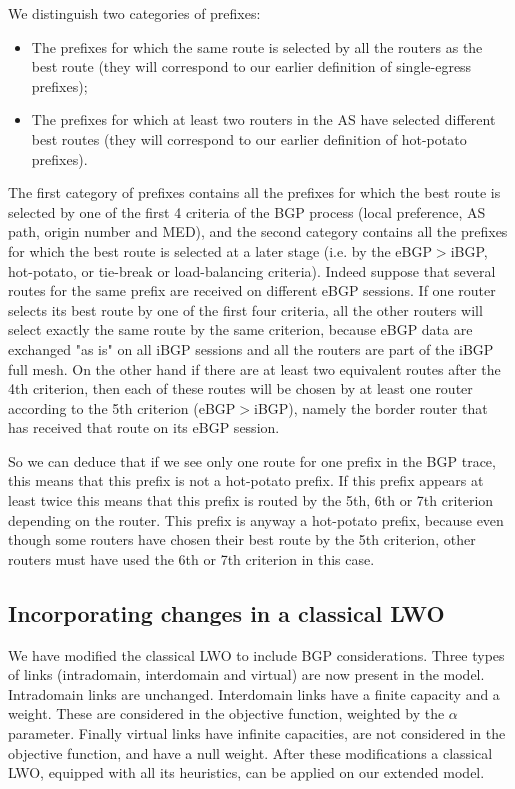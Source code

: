 \documentclass{acm_proc_article-sp}
\begin{document}
We distinguish two categories of prefixes:
\begin{itemize}
\item The prefixes for which the same route is selected by all the
  routers as the best route (they will correspond to our earlier definition of single-egress prefixes);
\item The prefixes for which at least two routers in the AS have
selected different best routes (they will correspond to our earlier definition of hot-potato prefixes).
\end{itemize}

The first category of prefixes contains all the prefixes
for which the best route is selected by one of the first 4 criteria
of the BGP process (local preference, AS path, origin
number and MED), 
and the second category contains all the prefixes for
which the best route is selected at a later stage (i.e. by the eBGP$>$iBGP, hot-potato, or tie-break
or load-balancing criteria). Indeed suppose that several routes for the same
prefix are received on different eBGP sessions. If one router selects its best
route by one of the first four criteria, all the other routers will select exactly the
same route by the same criterion, because eBGP data are exchanged "as is" 
on all iBGP sessions and all the routers are part of the iBGP
full mesh. On the other hand if there are at least two equivalent routes 
after the 4th criterion, then each of these routes will be chosen by at least one router 
according to the 5th criterion (eBGP$>$iBGP), namely the border router that has
received that route on its eBGP session.

So we can deduce that if we see only one route for one prefix in the BGP trace,
this means that this prefix is not a hot-potato prefix. 
If this prefix appears at least twice this
means that this prefix is routed by the 5th, 6th or 7th criterion
depending on the router. This prefix is anyway a hot-potato prefix, because
even though some routers have chosen their best route by the 5th criterion,
other routers must have used the 6th or 7th criterion in this case.

\subsection{Incorporating changes in a classical LWO}

We have modified the classical LWO to 
include BGP considerations. Three types of links
(intradomain, interdomain and virtual) are now present in the model. 
Intradomain links are unchanged. Interdomain links have a finite capacity and a weight. 
These are considered in the objective function, weighted by the $\alpha$
parameter.
Finally virtual links have infinite capacities, are not considered in 
the objective function, and have a null weight. 
After these modifications a classical LWO, equipped with all its heuristics, 
can be applied on our extended model.
\end{document}
